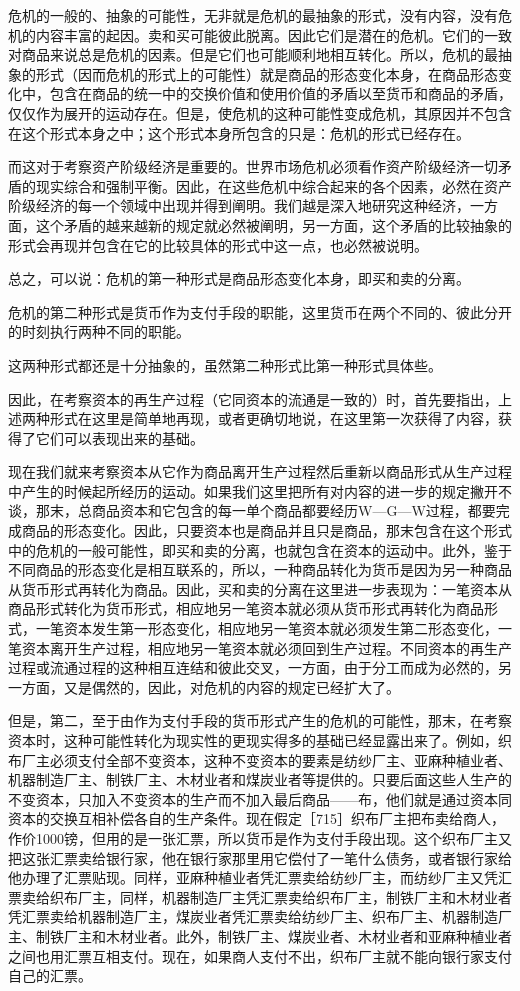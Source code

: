 危机的一般的、抽象的可能性，无非就是危机的最抽象的形式，没有内容，没有危机的内容丰富的起因。卖和买可能彼此脱离。因此它们是潜在的危机。它们的一致对商品来说总是危机的因素。但是它们也可能顺利地相互转化。所以，危机的最抽象的形式（因而危机的形式上的可能性）就是商品的形态变化本身，在商品形态变化中，包含在商品的统一中的交换价值和使用价值的矛盾以至货币和商品的矛盾，仅仅作为展开的运动存在。但是，使危机的这种可能性变成危机，其原因并不包含在这个形式本身之中；这个形式本身所包含的只是：危机的形式已经存在。

而这对于考察资产阶级经济是重要的。世界市场危机必须看作资产阶级经济一切矛盾的现实综合和强制平衡。因此，在这些危机中综合起来的各个因素，必然在资产阶级经济的每一个领域中出现并得到阐明。我们越是深入地研究这种经济，一方面，这个矛盾的越来越新的规定就必然被阐明，另一方面，这个矛盾的比较抽象的形式会再现并包含在它的比较具体的形式中这一点，也必然被说明。

总之，可以说：危机的第一种形式是商品形态变化本身，即买和卖的分离。

危机的第二种形式是货币作为支付手段的职能，这里货币在两个不同的、彼此分开的时刻执行两种不同的职能。

这两种形式都还是十分抽象的，虽然第二种形式比第一种形式具体些。

因此，在考察资本的再生产过程（它同资本的流通是一致的）时，首先要指出，上述两种形式在这里是简单地再现，或者更确切地说，在这里第一次获得了内容，获得了它们可以表现出来的基础。

现在我们就来考察资本从它作为商品离开生产过程然后重新以商品形式从生产过程中产生的时候起所经历的运动。如果我们这里把所有对内容的进一步的规定撇开不谈，那末，总商品资本和它包含的每一单个商品都要经历W—G—W过程，都要完成商品的形态变化。因此，只要资本也是商品并且只是商品，那末包含在这个形式中的危机的一般可能性，即买和卖的分离，也就包含在资本的运动中。此外，鉴于不同商品的形态变化是相互联系的，所以，一种商品转化为货币是因为另一种商品从货币形式再转化为商品。因此，买和卖的分离在这里进一步表现为：一笔资本从商品形式转化为货币形式，相应地另一笔资本就必须从货币形式再转化为商品形式，一笔资本发生第一形态变化，相应地另一笔资本就必须发生第二形态变化，一笔资本离开生产过程，相应地另一笔资本就必须回到生产过程。不同资本的再生产过程或流通过程的这种相互连结和彼此交叉，一方面，由于分工而成为必然的，另一方面，又是偶然的，因此，对危机的内容的规定已经扩大了。

但是，第二，至于由作为支付手段的货币形式产生的危机的可能性，那末，在考察资本时，这种可能性转化为现实性的更现实得多的基础已经显露出来了。例如，织布厂主必须支付全部不变资本，这种不变资本的要素是纺纱厂主、亚麻种植业者、机器制造厂主、制铁厂主、木材业者和煤炭业者等提供的。只要后面这些人生产的不变资本，只加入不变资本的生产而不加入最后商品——布，他们就是通过资本同资本的交换互相补偿各自的生产条件。现在假定［715］织布厂主把布卖给商人，作价1000镑，但用的是一张汇票，所以货币是作为支付手段出现。这个织布厂主又把这张汇票卖给银行家，他在银行家那里用它偿付了一笔什么债务，或者银行家给他办理了汇票贴现。同样，亚麻种植业者凭汇票卖给纺纱厂主，而纺纱厂主又凭汇票卖给织布厂主，同样，机器制造厂主凭汇票卖给织布厂主，制铁厂主和木材业者凭汇票卖给机器制造厂主，煤炭业者凭汇票卖给纺纱厂主、织布厂主、机器制造厂主、制铁厂主和木材业者。此外，制铁厂主、煤炭业者、木材业者和亚麻种植业者之间也用汇票互相支付。现在，如果商人支付不出，织布厂主就不能向银行家支付自己的汇票。

